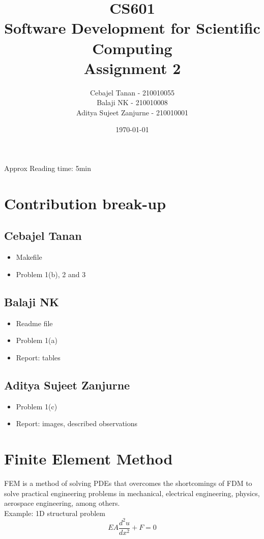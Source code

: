 \documentclass[10pt]{article}
\title{CS601 \\ Software Development for Scientific Computing \\ Assignment 2}
\author{Cebajel Tanan - 210010055 \\ Balaji NK - 210010008 \\ Aditya Sujeet Zanjurne - 210010001}
\date{\today}
\begin{document}
\maketitle
\tableofcontents

\newpage
Approx Reading time: 5min
\section{Contribution break-up}
\subsection*{Cebajel Tanan}
\begin{itemize}
    \item Makefile
    \item Problem 1(b), 2 and 3
\end{itemize}

\subsection*{Balaji NK}
\begin{itemize}
    \item Readme file
    \item Problem 1(a)
    \item Report: tables
\end{itemize}

\subsection*{Aditya Sujeet Zanjurne}
\begin{itemize}
    \item Problem 1(c)
    \item Report: images, described observations
\end{itemize}

\newpage
\section{Finite Element Method}
FEM is a method of solving PDEs that overcomes the shortcomings of FDM to solve practical
engineering problems in mechanical, electrical engineering, physics, aerospace engineering,
among others.\\
Example: 1D structural problem\\
\begin{equation}
EA \frac{d^2u}{dx^2} + F = 0
\end{equation}
\end{document}
